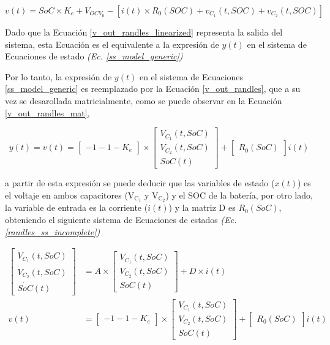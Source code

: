 \documentclass[10pt,a4paper]{article}
\begin{document}
\begin{equation}
    v(t) = SoC \times K_e + V_{OCV_0} - \left[i(t) \times R_0\left(SOC\right) 
        + v_{C_1}\left(t, SOC\right) + v_{C_2}\left(t, SOC\right)\right] 
    \label{v_out_randles_linearized}
\end{equation}

Dado que la Ecuaci\'on \ref{v_out_randles_linearized} representa la salida del 
sistema, esta Ecuaci\'on es el equivalente a la expresi\'on de $y(t)$ en el 
sistema de Ecuaciones de estado \emph{(Ec. \ref{ss_model_generic})}

Por lo tanto, la expresi\'on de $y(t)$ en el sistema de Ecuaciones
\ref{ss_model_generic} es reemplazado por la Ecuaci\'on \ref{v_out_randles}, que
a su vez se desarollada matricialmente, como se puede observar en la
Ecuaci\'on \ref{v_out_randles_mat},

\begin{equation}
    y(t) = v(t) = \begin{bmatrix} -1 -1 -K_e \end{bmatrix} \times 
    \begin{bmatrix} V_{C_1}(t, SoC) \\ V_{C_2}(t, SoC) \\ SoC(t) \end{bmatrix} +
    \begin{bmatrix} R_0(SoC) \end{bmatrix} i(t)\label{v_out_randles_mat}
\end{equation}

a partir de esta expresi\'on se puede deducir que las variables de estado 
($x(t)$) es el voltaje en ambos capacitores ($\mathrm{V_{C_1}}$ y 
$\mathrm{V_{C_2}}$) y el \acrshort{SOC} de la bater\'ia, por otro lado, la 
variable de entrada es la corriente ($i(t)$) y la matriz D es $R_0(SoC)$, 
obteniendo el siguiente sistema de Ecuaciones de estados 
\emph{(Ec. \ref{randles_ss_incomplete})}

\begin{align}
    \begin{bmatrix}
        \dot{V}_{C_1}(t, SoC) \\ \dot{V}_{C_2}(t, SoC) \\ \dot{SoC}(t)
    \end{bmatrix} &= 
    A\times\begin{bmatrix}V_{C_1}(t, SoC) \\ V_{C_2}(t, SoC) \\ SoC(t)\end{bmatrix}
    +
    D\times i(t)\nonumber \\
    v(t) &= \begin{bmatrix} -1 -1 -K_e \end{bmatrix} \times 
    \begin{bmatrix} V_{C_1}(t, SoC) \\ V_{C_2}(t, SoC) \\ SoC(t) \end{bmatrix} +
    \begin{bmatrix} R_0(SoC) \end{bmatrix} i(t)\label{randles_ss_incomplete}
\end{align}
\end{document}
